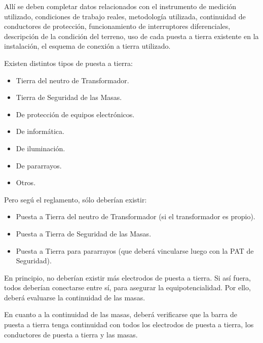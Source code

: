 Allí se deben completar datos relacionados con el instrumento de medición utilizado, condiciones de trabajo reales, metodología utilizada, continuidad de conductores de protección, funcionamiento de interruptores diferenciales, descripción de la condición del terreno, uso de cada puesta a tierra existente en la instalación, el esquema de conexión a tierra utilizado.


Existen distintos tipos de puesta a tierra:
\begin{itemize}
	\item Tierra del neutro de Transformador.
	\item Tierra de Seguridad de las Masas.
	\item De protección de equipos electrónicos.
	\item De informática.
	\item De iluminación.
	\item De pararrayos.
	\item Otros.
\end{itemize}

Pero segú el reglamento, sólo deberían existir:
\begin{itemize}
	\item Puesta a Tierra del neutro de Transformador (si el transformador es propio).
	\item Puesta a Tierra de Seguridad de las Masas.
	\item Puesta a Tierra para pararrayos (que deberá vincularse luego con la PAT de Seguridad).
\end{itemize}

En principio, no deberían existir más electrodos de puesta a tierra. Si así fuera, todos deberían conectarse entre sí, para asegurar la equipotencialidad. Por ello, deberá evaluarse la continuidad de las masas.

En cuanto a la continuidad de las masas, deberá verificarse que la barra de puesta a tierra tenga continuidad con todos los electrodos de puesta a tierra, los conductores de puesta a tierra y las masas.


